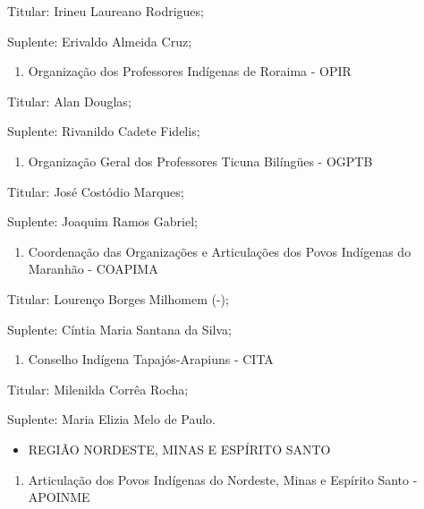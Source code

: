 \documentclass[
]{book}
\providecommand{\tightlist}{%
  \setlength{\itemsep}{0pt}\setlength{\parskip}{0pt}}
\begin{document}
Titular: Irineu Laureano Rodrigues;

Suplente: Erivaldo Almeida Cruz;

\begin{enumerate}
\def\labelenumi{\alph{enumi})}
\setcounter{enumi}{2}
\tightlist
\item
  Organização dos Professores Indígenas de Roraima - OPIR
\end{enumerate}

Titular: Alan Douglas;

Suplente: Rivanildo Cadete Fidelis;

\begin{enumerate}
\def\labelenumi{\alph{enumi})}
\setcounter{enumi}{3}
\tightlist
\item
  Organização Geral dos Professores Ticuna Bilíngües - OGPTB
\end{enumerate}

Titular: José Costódio Marques;

Suplente: Joaquim Ramos Gabriel;

\begin{enumerate}
\def\labelenumi{\alph{enumi})}
\setcounter{enumi}{4}
\tightlist
\item
  Coordenação das Organizações e Articulações dos Povos Indígenas do Maranhão - COAPIMA
\end{enumerate}

Titular: Lourenço Borges Milhomem (-);

Suplente: Cíntia Maria Santana da Silva;

\begin{enumerate}
\def\labelenumi{\alph{enumi})}
\setcounter{enumi}{5}
\tightlist
\item
  Conselho Indígena Tapajós-Arapiuns - CITA
\end{enumerate}

Titular: Milenilda Corrêa Rocha;

Suplente: Maria Elizia Melo de Paulo.

\begin{itemize}
\tightlist
\item
  REGIÃO NORDESTE, MINAS E ESPÍRITO SANTO
\end{itemize}

\begin{enumerate}
\def\labelenumi{\alph{enumi})}
\tightlist
\item
  Articulação dos Povos Indígenas do Nordeste, Minas e Espírito Santo - APOINME
\end{enumerate}
\end{document}
